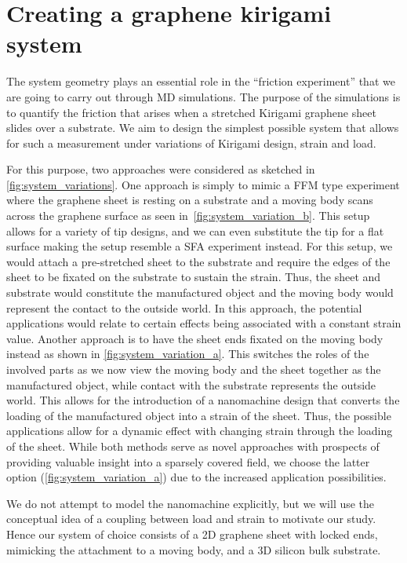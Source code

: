 \chapter{Creating a graphene kirigami system}\label{chap:system}

The system geometry plays an essential role in the ``friction experiment''
that we are going to carry out through \acrshort{MD} simulations. The purpose of
the simulations is to quantify the friction that arises when a stretched
Kirigami graphene sheet slides over a substrate. We aim to design the simplest
possible system that allows for such a measurement under variations of Kirigami
design, strain and load.

For this purpose, two approaches were considered as sketched in
\cref{fig:system_variations}. One approach is simply to mimic a \acrshort{FFM}
type experiment where the graphene sheet is resting on a substrate and a moving
body scans across the graphene surface as seen in~\cref{fig:system_variation_b}.
This setup allows for a variety of tip designs, and we can even substitute the
tip for a flat surface making the setup resemble a \acrshort{SFA} experiment
instead. For this setup, we would attach a pre-stretched sheet to the substrate
and require the edges of the sheet to be fixated on the substrate to sustain the
strain. Thus, the sheet and substrate would constitute the manufactured object
and the moving body would represent the contact to the outside world. In this
approach, the potential applications would relate to certain effects being
associated with a constant strain value. Another approach is to have the sheet
ends fixated on the moving body instead as shown in
\cref{fig:system_variation_a}. This switches the roles of the involved parts as
we now view the moving body and the sheet together as the manufactured object,
while contact with the substrate represents the outside world. This allows
for the introduction of a nanomachine design that converts the loading of the manufactured object into a strain of the sheet. Thus, the possible applications allow for a dynamic effect
with changing strain through the loading of the sheet. While both methods serve
as novel approaches with prospects of providing valuable insight into a sparsely
covered field, we choose the latter option (\cref{fig:system_variation_a}) due to the increased application possibilities.

We do not attempt to model the nanomachine explicitly, but we will use the
conceptual idea of a coupling between load and strain to motivate our study. Hence our system of choice consists of a 2D graphene sheet with locked ends, mimicking
the attachment to a moving body, and a 3D silicon bulk substrate. 


